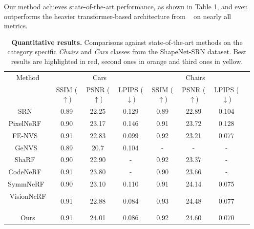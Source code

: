 Our method achieves state-of-the-art performance, as shown in Table \ref{table:comp_res}, and even outperforms the heavier transformer-based architecture from ~\citep{lin2023vision} on nearly all metrics.

\begin{table}[h!]
\caption{\textbf{Quantitative results.} Comparisons against state-of-the-art methods on the category specific \textit{Chairs} and \textit{Cars} classes from the ShapeNet-SRN dataset. Best results are highlighted in \colorbox{red!25}{red}, second ones in \colorbox{orange!25}{orange} and third ones in \colorbox{yellow!25}{yellow}. }
\label{table:comp_res}
\begin{center}%
\begin{adjustbox}{width = \linewidth}
\begin{tabular}[h]{c||ccccccc}
\hline
 Method & \multicolumn{3}{c}{Cars} & \multicolumn{3}{c}{Chairs} \\
 &  SSIM ($\uparrow$) & PSNR ($\uparrow$) & LPIPS ($\downarrow$) & SSIM ($\uparrow$) & PSNR ($\uparrow$) & LPIPS ($\downarrow$)\\
\hline
SRN ~\citep{sitzmann2019scene}& \cellcolor{yellow!25}0.89 & 22.25 & 0.129 & 0.89 & 22.89 & 0.104\\
PixelNeRF ~\citep{yu2021pixelnerf} & \cellcolor{orange!25}0.90 & 23.17 & 0.146 & \cellcolor{yellow!25}0.91 & 23.72 & 0.128\\
FE-NVS ~\citep{guo2022fast} & \cellcolor{red!25}0.91 & 22.83 & \cellcolor{yellow!25}0.099 & \cellcolor{orange!25}0.92 & 23.21 & 0.077 \\
GeNVS~\citep{chan2023genvs}& \cellcolor{yellow!25}0.89 & 20.7 & 0.104 & - & - & - \\
ShaRF ~\citep{rematas2021sharf} & \cellcolor{orange!25}0.90 & 22.90 & - & \cellcolor{orange!25}0.92 & 23.37 & - \\
CodeNeRF ~\citep{jang2021codenerf} & \cellcolor{red!25}0.91 & \cellcolor{orange!25}23.80 & - & 0.90 & 23.66 & -  \\
SymmNeRF\footnotemark~\citep{li2022symmnerf}& \cellcolor{orange!25}0.90 & \cellcolor{yellow!25}23.10 & 0.110 & \cellcolor{yellow!25}0.91 & \cellcolor{yellow!25}24.14  & \cellcolor{orange!25}0.075 \\
VisionNeRF ~\citep{lin2023vision} & \cellcolor{red!25}0.91 & 22.88 & \cellcolor{red!25}0.084 & \cellcolor{red!25}0.93 & \cellcolor{orange!25}24.48  & \cellcolor{yellow!25}0.077 \\
Ours &\cellcolor{red!25} 0.91 & \cellcolor{red!25} 24.01  &\cellcolor{orange!25}  0.086 &  \cellcolor{orange!25}0.92   & \cellcolor{red!25}24.60&  \cellcolor{red!25}0.070 \\

\hline 
\end{tabular}
\end{adjustbox}
\end{center}
\end{table}


